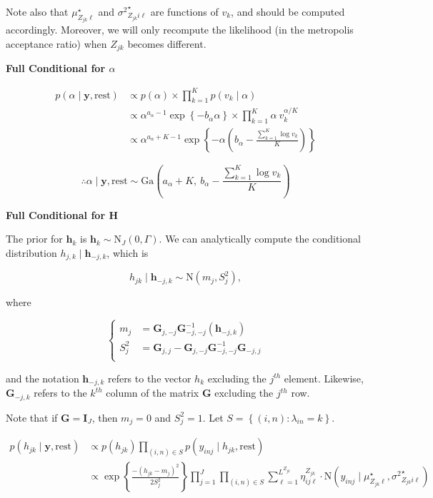 \documentclass[12pt,]{article}
\newcommand{\p}[1]{\left(#1\right)}
\newcommand{\bc}[1]{ \left\{#1\right\} }
\newcommand{\N}{ \mathcal{N} }
\newcommand{\I}{\mathrm{\mathbf{I}}}
\def\N{\text{N}}
\def\G{\text{Ga}}
\def\lin{\lambda_{in}}
\def\y{\bm{y}}
\def\mus{\mu^\star}
\def\sss{{\sigma^2}^\star}
\def\rest{\text{rest}}
\def\h{\bm{h}}
\begin{document}

Note also that \(\mus_{Z_{jk}\ell}\) and \(\sss_{Z_{jk}i\ell}\) are
functions of \(v_k\), and should be computed accordingly. Moreover, we
will only recompute the likelihood (in the metropolis acceptance ratio)
when \(Z_{jk}\) becomes different.
\vspace{2em}


\textbf{Full Conditional for $\alpha$}

\begin{align*}
p(\alpha \mid \y, \rest) &\propto p(\alpha) \times \prod_{k=1}^K p(v_k \mid \alpha) \\
&\propto \alpha^{a_\alpha - 1} \exp\bc{-b_\alpha \alpha} \times \prod_{k=1}^K 
\alpha~v_k^{\alpha/K} \\
&\propto \alpha^{a_\alpha + K -1} \exp\bc{-\alpha\p{b_\alpha - 
\frac{\sum_{k=1}^K \log v_k}{K}}}
\end{align*}

\[
\therefore \alpha \mid \y, \rest \sim 
\G\p{a_\alpha + K,~ b_\alpha - \frac{\sum_{k=1}^K \log v_k}{K}}
\]
\vspace{2em}


\textbf{Full Conditional for $\bm H$}

The prior for \(\h_k\) is \(\h_k \sim \N_J(0, \Gamma)\). We can
analytically compute the conditional distribution
\(h_{j,k} \mid \h_{-j,k}\), which is

\[
h_{jk}  \mid \h_{-j,k} \sim \N(m_j, S^2_j),
\]

where

\[
\begin{cases}
m_j &= \bm G_{j,-j} \bm G_{-j,-j}^{-1}(\h_{-j,k})\\
S_j^2 &= \bm G_{j,j} - \bm G_{j,-j}\bm G_{-j,-j}^{-1}\bm G_{-j,j}\\
\end{cases}
\]

and the notation \(\h_{-j,k}\) refers to the vector \(h_k\) excluding
the \(j^{th}\) element. Likewise, \(\bm G_{-j,k}\) refers to the
\(k^{th}\) column of the matrix \(\bm G\) excluding the \(j^{th}\) row.

Note that if \(\bm G = \I_J\), then \(m_j=0\) and \(S_j^2 = 1\). Let
\(S = \bc{(i,n)\colon \lin=k}\).

\begin{align*}
p(h_{jk} \mid \y, \rest)  &\propto p(h_{jk}) \prod_{(i,n) \in S} p(y_{inj} \mid h_{jk}, \rest) \\
%
&\propto
\exp\bc{\frac{-(h_{jk} - m_j)^2}{2S_j^2}}
 \prod_{j=1}^J \prod_{(i,n)\in S}
\sum_{\ell=1}^{L^{Z_{jk}}} \eta^{Z_{jk}}_{ij\ell} \cdot
\N(y_{inj} \mid \mus_{Z_{jk}\ell}, \sss_{Z_{jk}i\ell})
\end{align*}
\end{document}
